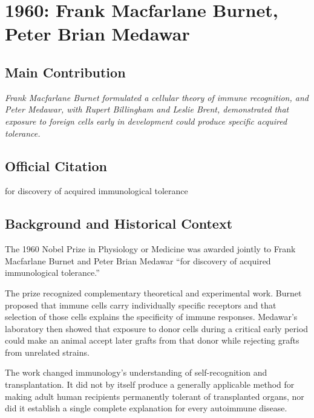 \chapter[1960 --- Burnet and Medawar]{1960: Frank Macfarlane Burnet, Peter Brian Medawar}
\label{ch:1960_Burnet}

\section*{Main Contribution}

\textit{Frank Macfarlane Burnet formulated a cellular theory of immune recognition, and Peter Medawar, with Rupert Billingham and Leslie Brent, demonstrated that exposure to foreign cells early in development could produce specific acquired tolerance.}\cite{nobel-1960,lecture-burnet-1960,tolerance-1953}

\section{Official Citation}

for discovery of acquired immunological tolerance

\section{Background and Historical Context}

The 1960 Nobel Prize in Physiology or Medicine was awarded jointly to Frank Macfarlane Burnet and Peter Brian Medawar ``for discovery of acquired immunological tolerance.''\cite{nobel-1960}

The prize recognized complementary theoretical and experimental work. Burnet proposed that immune cells carry individually specific receptors and that selection of those cells explains the specificity of immune responses. Medawar's laboratory then showed that exposure to donor cells during a critical early period could make an animal accept later grafts from that donor while rejecting grafts from unrelated strains.

The work changed immunology's understanding of self-recognition and transplantation. It did not by itself produce a generally applicable method for making adult human recipients permanently tolerant of transplanted organs, nor did it establish a single complete explanation for every autoimmune disease.

